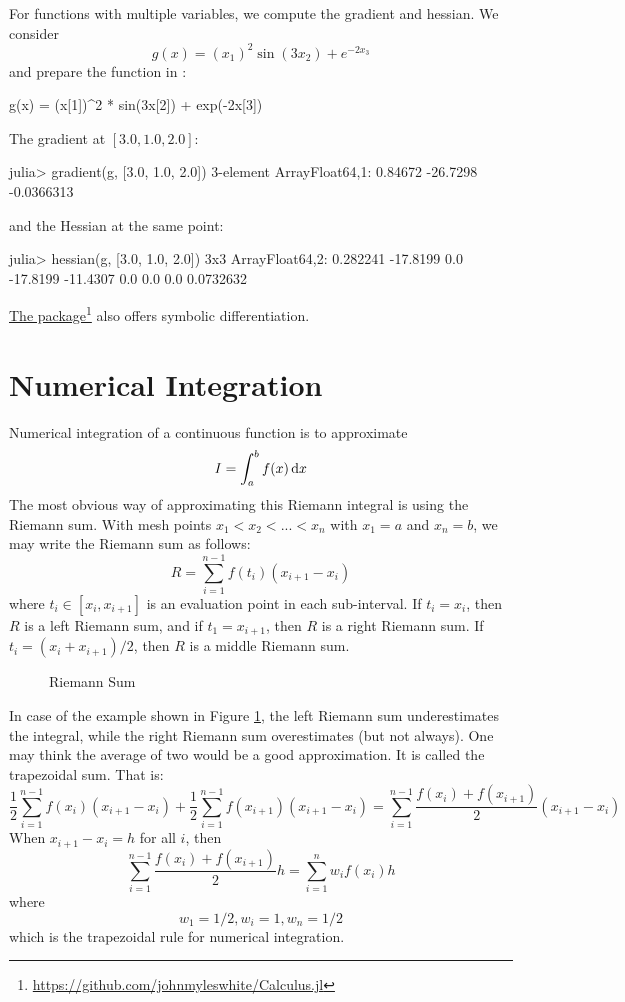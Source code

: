 For functions with multiple variables, we compute the gradient and hessian. We consider
\[
	g(x) = (x_1)^2 \sin(3x_2) + e^{-2x_3}
\]
\noindent and prepare the function in \julia{}:
\begin{code}
g(x) = (x[1])^2 * sin(3x[2]) + exp(-2x[3])
\end{code}
\noindent The gradient at $[3.0, 1.0, 2.0]$:
\begin{code}
julia> gradient(g, [3.0, 1.0, 2.0])
3-element Array{Float64,1}:
   0.84672
 -26.7298
  -0.0366313
\end{code}
\noindent and the Hessian at the same point:
\begin{code}
julia> hessian(g, [3.0, 1.0, 2.0])
3x3 Array{Float64,2}:
   0.282241  -17.8199  0.0
 -17.8199    -11.4307  0.0
   0.0         0.0     0.0732632
\end{code}

\href{https://github.com/johnmyleswhite/Calculus.jl}{The  package}\footnote{\url{https://github.com/johnmyleswhite/Calculus.jl}} also offers symbolic differentiation.






\section{Numerical Integration}

Numerical integration of a continuous function is to approximate
\[
	I = \int_a^b f(x) \mathop{}\!\mathrm{d}x
\]
The most obvious way of approximating this Riemann integral is using the Riemann sum. With  mesh points $x_1< x_2< ...< x_n$ with $x_1=a$ and $x_n=b$, we may write the Riemann sum as follows:
\[
	R = \sum_{i=1}^{n-1} f(t_i) (x_{i+1}-x_i)
\]
where $t_i\in[x_i,x_{i+1}]$ is an evaluation point in each sub-interval. If $t_i=x_i$, then $R$ is a left Riemann sum, and if $t_1=x_{i+1}$, then $R$ is a right Riemann sum. If $t_i=(x_i+x_{i+1})/2$, then $R$ is a middle Riemann sum.

\begin{figure}
\caption{Riemann Sum\label{fig:riemann}}
\end{figure}

In case of the example shown in Figure \ref{fig:riemann}, the left Riemann sum underestimates the integral, while the right Riemann sum overestimates (but not always). One may think the average of two would be a good approximation. It is called the trapezoidal sum. That is:
\[
\frac{1}{2} \sum_{i=1}^{n-1} f(x_i) (x_{i+1}-x_i) +
\frac{1}{2} \sum_{i=1}^{n-1} f(x_{i+1}) (x_{i+1}-x_i)
= \sum_{i=1}^{n-1} \frac{f(x_i)+f(x_{i+1})}{2}(x_{i+1}-x_i)
\]
When $x_{i+1}-x_i=h$ for all $i$, then
\[
\sum_{i=1}^{n-1} \frac{f(x_i)+f(x_{i+1})}{2} h
= \sum_{i=1}^{n} w_i f(x_i) h
\]
where
\[
w_1 = 1/2,
w_i = 1,
w_n = 1/2
\]
which is the trapezoidal rule for numerical integration.

